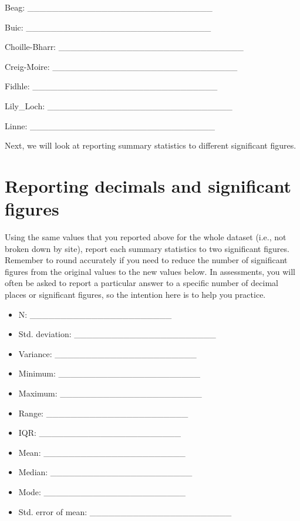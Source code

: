 \documentclass[
]{scrbook}
\providecommand{\tightlist}{%
  \setlength{\itemsep}{0pt}\setlength{\parskip}{0pt}}
\begin{document}
Beag: \_\_\_\_\_\_\_\_\_\_\_\_\_\_\_\_\_\_\_\_\_\_\_\_\_\_\_\_\_\_

Buic: \_\_\_\_\_\_\_\_\_\_\_\_\_\_\_\_\_\_\_\_\_\_\_\_\_\_\_\_\_\_

Choille-Bharr: \_\_\_\_\_\_\_\_\_\_\_\_\_\_\_\_\_\_\_\_\_\_\_\_\_\_\_\_\_\_

Creig-Moire: \_\_\_\_\_\_\_\_\_\_\_\_\_\_\_\_\_\_\_\_\_\_\_\_\_\_\_\_\_\_

Fidhle: \_\_\_\_\_\_\_\_\_\_\_\_\_\_\_\_\_\_\_\_\_\_\_\_\_\_\_\_\_\_

Lily\_Loch: \_\_\_\_\_\_\_\_\_\_\_\_\_\_\_\_\_\_\_\_\_\_\_\_\_\_\_\_\_\_

Linne: \_\_\_\_\_\_\_\_\_\_\_\_\_\_\_\_\_\_\_\_\_\_\_\_\_\_\_\_\_\_

Next, we will look at reporting summary statistics to different significant figures.

\hypertarget{reporting-decimals-and-significant-figures}{%
\section{Reporting decimals and significant figures}\label{reporting-decimals-and-significant-figures}}

Using the same values that you reported above for the whole dataset (i.e., not broken down by site), report each summary statistics to two significant figures.
Remember to round accurately if you need to reduce the number of significant figures from the original values to the new values below.
In assessments, you will often be asked to report a particular answer to a specific number of decimal places or significant figures, so the intention here is to help you practice.

\begin{itemize}
\tightlist
\item
  N: \_\_\_\_\_\_\_\_\_\_\_\_\_\_\_\_\_\_\_\_\_\_\_
\item
  Std. deviation: \_\_\_\_\_\_\_\_\_\_\_\_\_\_\_\_\_\_\_\_\_\_\_
\item
  Variance: \_\_\_\_\_\_\_\_\_\_\_\_\_\_\_\_\_\_\_\_\_\_\_
\item
  Minimum: \_\_\_\_\_\_\_\_\_\_\_\_\_\_\_\_\_\_\_\_\_\_\_
\item
  Maximum: \_\_\_\_\_\_\_\_\_\_\_\_\_\_\_\_\_\_\_\_\_\_\_
\item
  Range: \_\_\_\_\_\_\_\_\_\_\_\_\_\_\_\_\_\_\_\_\_\_\_
\item
  IQR: \_\_\_\_\_\_\_\_\_\_\_\_\_\_\_\_\_\_\_\_\_\_\_
\item
  Mean: \_\_\_\_\_\_\_\_\_\_\_\_\_\_\_\_\_\_\_\_\_\_\_
\item
  Median: \_\_\_\_\_\_\_\_\_\_\_\_\_\_\_\_\_\_\_\_\_\_\_
\item
  Mode: \_\_\_\_\_\_\_\_\_\_\_\_\_\_\_\_\_\_\_\_\_\_\_
\item
  Std. error of mean: \_\_\_\_\_\_\_\_\_\_\_\_\_\_\_\_\_\_\_\_\_\_\_
\end{itemize}
\end{document}
